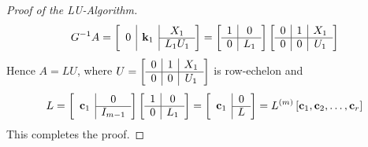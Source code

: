 \begin{proof}[Proof of the LU-Algorithm]
\begin{equation*}
G^{-1}A = \leftB \begin{array}{c|c|c}
\multirow{2}{*}{$0$} & \multirow{2}{*}{$\vect{k}_1$} & X_1 \\\cline{3-3}
& & L_{1}U_{1}
\end{array}\rightB = \leftB \begin{array}{c|c}
1 & 0 \\
\hline
0 & L_{1}
\end{array} \rightB \leftB \begin{array}{c|c|c}
0 & 1 & X_{1} \\
\hline
0 & 0 & U_{1}
\end{array} \rightB
\end{equation*}
Hence $A = LU$, where $U = \left[ \begin{array}{c|c|c}
0 & 1 & X_{1} \\
\hline
0 & 0 & U_{1}
\end{array} \right]$
 is row-echelon and
\begin{equation*}
L = \leftB \begin{array}{c|c}
\multirow{2}{*}{$\vect{c}_{1}$} & 0 \\\cline{2-2}
& I_{m-1}
\end{array}\rightB \leftB \begin{array}{c|c}
1 & 0 \\
\hline
0 & L_{1}
\end{array} \rightB = \leftB \begin{array}{c|c}
\multirow{2}{*}{$\vect{c}_{1}$} & 0 \\\cline{2-2}
& L
\end{array}\rightB = L^{(m)} \leftB \vect{c}_{1}, \vect{c}_{2}, \dots, \vect{c}_{r} \rightB
\end{equation*}
This completes the proof.
\end{proof}

